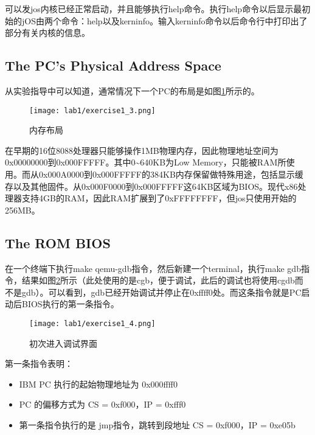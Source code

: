 \par 可以发jos内核已经正常启动，并且能够执行help命令。执行help命令以后显示最初始的jOS由两个命令：help以及kerninfo。输入kerninfo命令以后命令行中打印出了部分有关内核的信息。

\FloatBarrier
\subsection{The PC's Physical Address Space}
\par 从实验指导中可以知道，通常情况下一个PC的布局是如图\ref{fig:exercise1_3}所示的。
\begin{figure}[htb]
    \centering
    \texttt{[image: lab1/exercise1\_3.png]}
    \caption{内存布局}
    \label{fig:exercise1_3}
\end{figure}

\par 在早期的16位8088处理器只能够操作1MB物理内存，因此物理地址空间为0x00000000到0x000FFFFF。其中0\textasciitilde 640KB为Low Memory，只能被RAM所使用。而从0x000A0000到0x000FFFFF的384KB内存保留做特殊用途，包括显示缓存以及其他固件。从0x000F0000到0x000FFFFF这64KB区域为BIOS。现代x86处理器支持4GB的RAM，因此RAM扩展到了0xFFFFFFFF，但jos只使用开始的256MB。

\FloatBarrier
\subsection{The ROM BIOS}
\par 在一个终端下执行make qemu-gdb指令，然后新建一个terminal，执行make gdb指令，结果如图\ref{fig:exercise1_4}所示（此处使用的是cgb，便于调试，此后的调试也将使用cgdb而不是gdb）。可以看到，gdb已经开始调试并停止在0xffff0处。而这条指令就是PC启动后BIOS执行的第一条指令。
\begin{figure}[htb]
    \centering
    \texttt{[image: lab1/exercise1\_4.png]}
    \caption{初次进入调试界面}
    \label{fig:exercise1_4}
\end{figure}

\par 第一条指令表明：
\begin{itemize}
    \item IBM PC 执行的起始物理地址为 0x000ffff0
    \item PC 的偏移方式为 CS = 0xf000，IP = 0xfff0
    \item 第一条指令执行的是 jmp指令，跳转到段地址 CS = 0xf000，IP = 0xe05b
\end{itemize}

